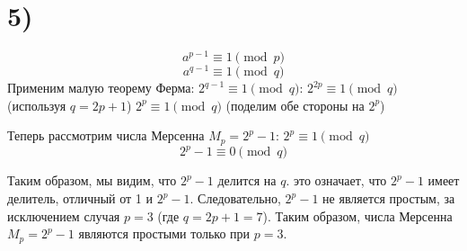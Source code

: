  \section*{5)}
$$a^{p-1}\equiv 1\pmod{p}$$
$$a^{q-1}\equiv 1\pmod{q}$$
Применим малую теорему Ферма: $2^{q-1} \equiv 1 \pmod q$:
$2^{2p} \equiv 1 \pmod q$ (используя $q = 2p + 1$)
$2^{p} \equiv 1 \pmod q$ (поделим обе стороны на $2^p$)

Теперь рассмотрим числа Мерсенна $M_p = 2^p - 1$:
$2^p \equiv 1 \pmod q$ \\
$$2^p - 1 \equiv 0 \pmod q$$

Таким образом, мы видим, что $2^p - 1$ делится на $q$. это означает, что $2^p - 1$ имеет делитель, отличный от 1 и $2^p - 1$. Следовательно, $2^p - 1$ не является простым, за исключением случая $p = 3$ (где $q = 2p + 1 = 7$). Таким образом, числа Мерсенна $M_p = 2^p - 1$ являются простыми только при $p = 3$.
